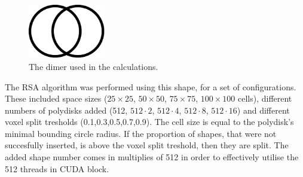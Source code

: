 \documentclass[12pt, oneside]{report}
\begin{document}
\begin{figure}[H]
  \centering
	\includegraphics[width=0.3\textwidth,keepaspectratio]{Images/SummaryOptimisation/dimer.pdf}
	\caption{The dimer used in the calculations.}
	\label{summary_dimer}
\end{figure}
The RSA algorithm was performed using this shape, for a set of configurations. These included space sizes ($25 \times 25$, $50 \times 50$, $75 \times 75$, $100 \times 100$ cells), different numbers of polydisks added (512, $512 \cdot 2$, $512 \cdot 4$, $512 \cdot 8$, $512 \cdot 16$) and different voxel split tresholds (0.1,0.3,0.5,0.7,0.9). The cell size is equal to the polydisk's minimal bounding circle radius.
If the proportion of shapes, that were not succesfully inserted, is above the voxel split treshold, then they are split. The added shape number comes in multiplies of 512 in order to effectively utilise the 512 threads in CUDA block.
\end{document}
